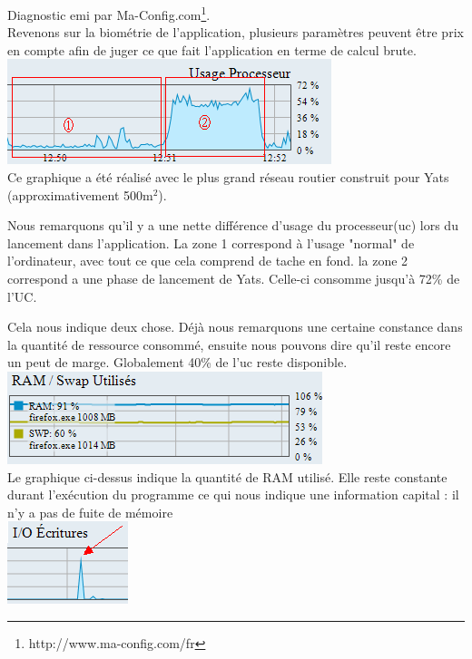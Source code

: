 \documentclass[a4paper,11pt]{article}
\begin{document}
Diagnostic emi par Ma-Config.com\footnote{http://www.ma-config.com/fr}.\\

Revenons sur la biométrie de l'application, plusieurs paramètres peuvent être prix en compte afin de juger ce que fait l'application en terme de calcul brute.\\

\includegraphics[scale=0.6]{bio/uc.PNG}\\

Ce graphique a été réalisé avec le plus grand réseau routier construit pour Yats (approximativement 500m$^2$).

Nous remarquons qu'il y a une nette différence d'usage du processeur(uc) lors du lancement dans l'application. La zone 1 correspond à l'usage "normal" de l'ordinateur, avec tout ce que cela comprend de tache en fond. la zone 2 correspond a une phase de lancement de Yats. Celle-ci consomme jusqu'à 72\% de l'UC. 

Cela nous indique deux chose. Déjà nous remarquons une certaine constance dans la quantité de ressource consommé, ensuite nous pouvons dire qu'il reste encore un peut de marge. Globalement 40\% de l'uc reste disponible.\\

\includegraphics[scale=0.6]{bio/ram.PNG}\\

Le graphique ci-dessus indique la quantité de RAM utilisé. Elle reste constante durant l'exécution du programme ce qui nous indique une information capital : il n'y a pas de fuite de mémoire\\

\includegraphics[scale=0.6]{bio/ecriture.png}\\
\end{document}
